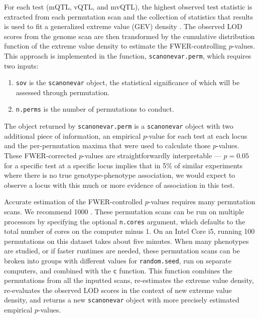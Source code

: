 \documentclass[9pt,twocolumn,twoside]{gsag3jnl}
\begin{document}
For each test (mQTL, vQTL, and mvQTL), the highest observed test statistic is extracted from each permutation scan and the collection of statistics that results is used to fit a generalized extreme value (GEV) density \citep{Stephenson2002}.
The observed LOD scores from the genome scan are then transformed by the cumulative distribution function of the extreme value density to estimate the FWER-controlling $p$-values.
This approach is implemented in the function, \texttt{scanonevar.perm}, which requires two inputs:

\begin{enumerate}
	\item \texttt{sov} is the \texttt{scanonevar} object, the statistical significance of which will be assessed through permutation.
	\item \texttt{n.perms} is the number of permutations to conduct.
\end{enumerate}

The object returned by \texttt{scanonevar.perm} is a \texttt{scanonevar} object with two additional piece of information, an empirical $p$-value for each test at each locus and the per-permutation maxima that were used to calculate those $p$-values.
These FWER-corrected $p$-values are straightforwardly interpretable --- $p = 0.05$ for a specific test at a specific locus implies that in 5\% of similar experiments where there is no true genotype-phenotype association, we would expect to observe a locus with this much or more evidence of association in this test.

Accurate estimation of the FWER-controlled $p$-values requires many permutation scans.
We recommend 1000 \citep{Churchill1994,Carlborg2002}.
These permutation scans can be run on multiple processors by specifying the optional \texttt{n.cores} argument, which defaults to the total number of cores on the computer minus 1.
On an Intel Core i5, running 100 permutations on this dataset takes about five minutes.
When many phenotypes are studied, or if faster runtimes are needed, these permutation scans can be broken into groups with different values for \texttt{random.seed}, run on separate computers, and combined with the \texttt{c} function.
This function combines the permutations from all the inputted scans, re-estimates the extreme value density, re-evaluates the observed LOD scores in the context of new extreme value density, and returns a new \texttt{scanonevar} object with more precisely estimated empirical $p$-values.
\end{document}
